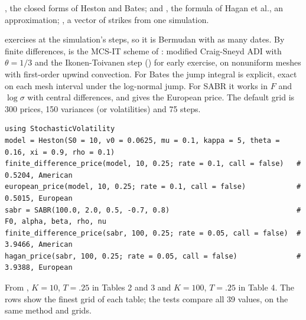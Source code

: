 , the closed forms of Heston and Bates;  and , the formula of
Hagan et al., an approximation; , a vector of strikes from one simulation.

 exercises at the simulation's steps, so it is Bermudan with as many dates.
By finite differences,  is the MCS-IT scheme of : modified
Craig-Sneyd ADI with $\theta = 1/3$ and the Ikonen-Toivanen step () for early
exercise, on nonuniform meshes with first-order upwind convection. For Bates the jump integral is explicit, exact on each
mesh interval under the log-normal jump. For SABR it works in $F$ and $\log\sigma$ with central differences, and
 gives the European price. The default grid is 300 prices, 150 variances (or volatilities) and 75 steps.

\begin{footnotesize}
\begin{verbatim}
using StochasticVolatility
model = Heston(S0 = 10, v0 = 0.0625, mu = 0.1, kappa = 5, theta = 0.16, xi = 0.9, rho = 0.1)
finite_difference_price(model, 10, 0.25; rate = 0.1, call = false)   # 0.5204, American
european_price(model, 10, 0.25; rate = 0.1, call = false)            # 0.5015, European
sabr = SABR(100.0, 2.0, 0.5, -0.7, 0.8)                              # F0, alpha, beta, rho, nu
finite_difference_price(sabr, 100, 0.25; rate = 0.05, call = false)  # 3.9466, American
hagan_price(sabr, 100, 0.25; rate = 0.05, call = false)              # 3.9388, European
\end{verbatim}
\end{footnotesize}

\newpage
{}
From , $K = 10$, $T = .25$ in Tables 2 and 3 and $K = 100$, $T = .25$ in Table 4. The
rows show the finest grid of each table; the tests compare all 39 values, on the same method and grids.

